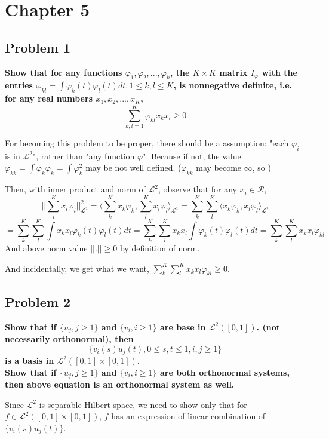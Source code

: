 \documentclass{article}
\begin{document}
\section{Chapter 5}
\subsection{Problem 1}
\textbf{
Show that for any functions $\varphi_1,\varphi_2,...,\varphi_k$, the $K\times K$ matrix $I_\varphi$
with the entries $\varphi_{kl}=\int{\varphi_k(t)\varphi_l(t)dt}, 1\leq k,l\leq K$, is nonnegative definite, 
i.e. for any real numbers $x_1,x_2,...,x_K$,
\[\sum_{k,l=1}^K \varphi_{kl}x_kx_l\geq 0\]
}


For becoming this problem to be proper, there should be a assumption: "each $\varphi_i$ is in $\mathcal{L}^2$",
rather than "any function $\varphi$".
Because if not, the value $\varphi_{kk}=\int\varphi_k\varphi_k=\int\varphi_k^2$ may be not well defined. 
($\varphi_{kk}$ may become $\infty$, so )

Then, with inner product and norm of $\mathcal{L}^2$, observe that for any $x_i\in\mathcal{R}$,
\[||\sum_i^K{x_i\varphi_i}||_{\mathcal{L}^2}^2 = \langle \sum_k^K{x_k\varphi_k}, \sum_l^K{x_l\varphi_l} \rangle_{\mathcal{L}^2}
= \sum_k^K \sum_l^K \langle x_k\varphi_k, x_l\varphi_l \rangle_{\mathcal{L}^2}\]
\[=\sum_k^K \sum_l^K \int{x_k x_l \varphi_k(t) \varphi_l(t) dt} 
=\sum_k^K \sum_l^K x_k x_l \int{\varphi_k(t) \varphi_l(t) dt} 
=\sum_k^K \sum_l^K x_k x_l \varphi_{kl}\]
And above norm value $||.||\geq 0 $ by definition of norm.

And incidentally, we get what we want, \(\sum_k^K \sum_l^K x_k x_l \varphi_{kl} \geq 0\).


\subsection{Problem 2}
\textbf{
Show that if $\{u_j, j\geq 1\}$ and $\{v_i, i\geq 1\}$ are base in $\mathcal{L}^2([0,1])$.
(not necessarily orthonormal), then
\[\{v_i(s)u_j(t), 0\leq s,t \leq 1 , i,j\geq 1\}\]
is a basis in $\mathcal{L}^2([0,1]\times[0,1])$. \\
Show that if $\{u_j, j\geq 1\}$ and $\{v_i, i\geq 1\}$ are both orthonormal systems,
then above equation is an orthonormal system as well.
}

Since $\mathcal{L}^2$ is separable Hilbert space, we need to show only that for $f\in \mathcal{L}^2([0,1]\times[0,1])$,
$f$ has an expression of linear combination of $\{v_i(s)u_j(t)\}$.
\end{document}

